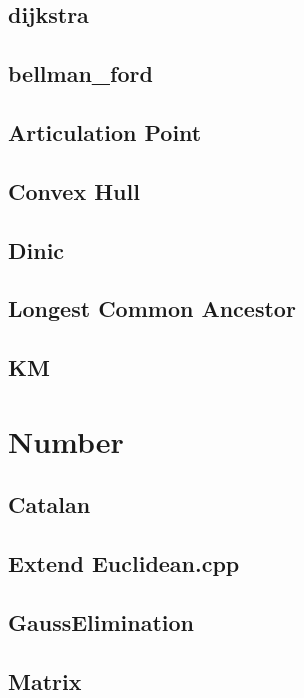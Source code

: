 \subsection{dijkstra}

\subsection{bellman_ford}

\subsection{Articulation Point}

\subsection{Convex Hull}

\subsection{Dinic}

\subsection{Longest Common Ancestor}

\subsection{KM}


\section{Number}

\subsection{Catalan}

\subsection{Extend Euclidean.cpp}

\subsection{GaussElimination}

\subsection{Matrix}

